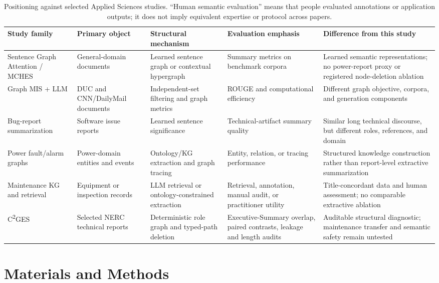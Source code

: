 \documentclass[applsci,article,submit,moreauthors]{Definitions/mdpi}
\newcommand{\cges}{C\textsuperscript{2}GES}
\begin{document}
\begin{table}[H]
\caption{Positioning against selected Applied Sciences studies. ``Human semantic evaluation'' means that people evaluated annotations or application outputs; it does not imply equivalent expertise or protocol across papers.}
\label{tab:related-comparison}\centering\scriptsize
\begin{tabularx}{\textwidth}{p{2.5cm}p{2.4cm}p{2.5cm}p{2.5cm}X}
\toprule
Study family & Primary object & Structural mechanism & Evaluation emphasis & Difference from this study\\
\midrule
Sentence Graph Attention / MCHES \cite{siragusa2022sentencegraph,onan2024mches} & General-domain documents & Learned sentence graph or contextual hypergraph & Summary metrics on benchmark corpora & Learned semantic representations; no power-report proxy or registered node-deletion ablation\\
Graph MIS + LLM \cite{hark2025mis} & DUC and CNN/DailyMail documents & Independent-set filtering and graph metrics & ROUGE and computational efficiency & Different graph objective, corpora, and generation components\\
Bug-report summarization \cite{koh2022bugreport} & Software issue reports & Learned sentence significance & Technical-artifact summary quality & Similar long technical discourse, but different roles, references, and domain\\
Power fault/alarm graphs \cite{liu2022powerfault,ma2025alarm} & Power-domain entities and events & Ontology/KG extraction and graph tracing & Entity, relation, or tracing performance & Structured knowledge construction rather than report-level extractive summarization\\
Maintenance KG and retrieval \cite{cao2024coalmaintenance,zgg2026bridge} & Equipment or inspection records & LLM retrieval or ontology-constrained extraction & Retrieval, annotation, manual audit, or practitioner utility & Title-concordant data and human assessment; no comparable extractive ablation\\
\cges{} & Selected NERC technical reports & Deterministic role graph and typed-path deletion & Executive-Summary overlap, paired contrasts, leakage and length audits & Auditable structural diagnostic; maintenance transfer and semantic safety remain untested\\
\bottomrule
\end{tabularx}
\end{table}

\section{Materials and Methods}
\end{document}
